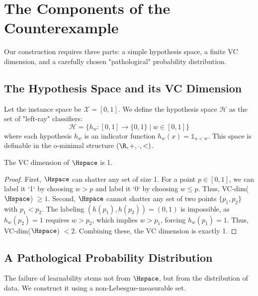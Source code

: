 \section{The Components of the Counterexample}

Our construction requires three parts: a simple hypothesis space, a finite VC dimension, and a carefully chosen "pathological" probability distribution.

\subsection{The Hypothesis Space and its VC Dimension}

\begin{definition}
    Let the instance space be $\mathcal{X} = [0, 1]$. We define the hypothesis space $\mathcal{H}$ as the set of "left-ray" classifiers:
    \[ \mathcal{H} = \{h_w : [0, 1] \to \{0, 1\} \mid w \in [0, 1]\} \]
    where each hypothesis $h_w$ is an indicator function $h_w(x) = \mathds{1}_{x<w}$. This space is definable in the o-minimal structure $(\R, +, \cdot, <)$.
\end{definition}

\begin{proposition}
    The VC dimension of $\Hspace$ is 1.
\end{proposition}

\begin{proof}

    First, $\Hspace$ can shatter any set of size 1. For a point $p \in [0, 1]$, we can label it `1` by choosing $w > p$ and label it `0` by choosing $w \le p$. Thus, VC-dim($\Hspace$) $\ge 1$. Second, $\Hspace$ cannot shatter any set of two points $\{p_1, p_2\}$ with $p_1 < p_2$. The labeling $(h(p_1), h(p_2)) = (0, 1)$ is impossible, as $h_w(p_2)=1$ requires $w > p_2$, which implies $w > p_1$, forcing $h_w(p_1)=1$. Thus, VC-dim($\Hspace$) $< 2$. Combining these, the VC dimension is exactly 1.
\end{proof}

\subsection{A Pathological Probability Distribution}

The failure of learnability stems not from $\Hspace$, but from the distribution of data. We construct it using a non-Lebesgue-measurable set.

